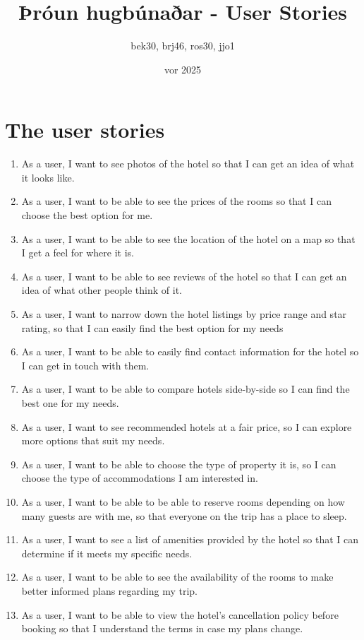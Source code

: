 \documentclass{article}
\title{Þróun hugbúnaðar - User Stories}
\author{ bek30, brj46, ros30, jjo1 }
\date{vor 2025}
\begin{document}
\maketitle

\section{The user stories}

\begin{enumerate}
    \item As a user, I want to see photos of the hotel so that I can get an idea of what it looks like.
    \item As a user, I want to be able to see the prices of the rooms so that I can choose the best option for me.
    \item As a user, I want to be able to see the location of the hotel on a map so that I get a feel for where it is.
    \item As a user, I want to be able to see reviews of the hotel so that I can get an idea of what other people think of it.
    \item As a user, I want to narrow down the hotel listings by price range and star rating, so that I can easily find the best option for my needs    
    \item As a user, I want to be able to easily find contact information for the hotel so I can get in touch with them.
    \item As a user, I want to be able to compare hotels side-by-side so I can find the best one for my needs.
    \item As a user, I want to see recommended hotels at a fair price, so I can explore more options that suit my needs.
    \item As a user, I want to be able to choose the type of property it is, so I can choose the type of accommodations I am interested in.
    \item As a user, I want to be able to be able to reserve rooms depending on how many guests are with me, so that everyone on the trip has a place to sleep.
    \item As a user, I want to see a list of amenities provided by the hotel so that I can determine if it meets my specific needs.
    \item As a user, I want to be able to see the availability of the rooms to make better informed plans regarding my trip.
    \item As a user, I want to be able to view the hotel's cancellation policy before booking so that I understand the terms in case my plans change.
\end{enumerate}
\end{document}
